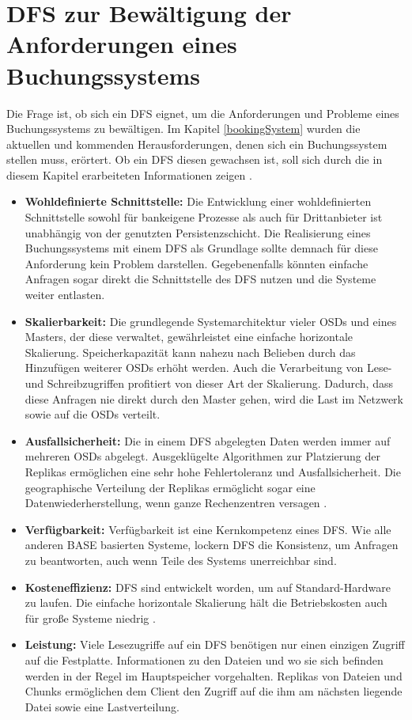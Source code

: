 \documentclass[12pt,oneside,a4paper,parskip]{scrbook}
\begin{document}
\section{DFS zur Bewältigung der Anforderungen eines Buchungssystems}
Die Frage ist, ob sich ein DFS eignet, um die Anforderungen und Probleme eines Buchungssystems zu bewältigen.
Im Kapitel \ref{bookingSystem} wurden die aktuellen und kommenden Herausforderungen, denen sich ein Buchungssystem stellen muss, erörtert. Ob ein DFS diesen gewachsen ist, soll sich durch die in diesem Kapitel erarbeiteten Informationen zeigen \cite{largeHadoop}.


\begin{itemize}
  \item \textbf{Wohldefinierte Schnittstelle:} Die Entwicklung einer wohldefinierten Schnittstelle sowohl für bankeigene Prozesse als auch für Drittanbieter ist unabhängig von der genutzten Persistenzschicht. Die Realisierung eines Buchungssystems mit einem DFS als Grundlage sollte demnach für diese Anforderung kein Problem darstellen. Gegebenenfalls könnten einfache Anfragen sogar direkt die Schnittstelle des DFS nutzen und die Systeme weiter entlasten.

  \item \textbf{Skalierbarkeit:} Die grundlegende Systemarchitektur vieler OSDs und eines Masters, der diese verwaltet, gewährleistet eine einfache horizontale Skalierung. Speicherkapazität kann nahezu nach Belieben durch das Hinzufügen weiterer OSDs erhöht werden. Auch die Verarbeitung von Lese- und Schreibzugriffen profitiert von dieser Art der Skalierung. Dadurch, dass diese Anfragen nie direkt durch den Master gehen, wird die Last im Netzwerk sowie auf die OSDs verteilt.

  \item \textbf{Ausfallsicherheit:} Die in einem DFS abgelegten Daten werden immer auf mehreren OSDs abgelegt. Ausgeklügelte Algorithmen zur Platzierung der Replikas ermöglichen eine sehr hohe Fehlertoleranz und Ausfallsicherheit. Die geographische Verteilung der Replikas ermöglicht sogar eine Datenwiederherstellung, wenn ganze Rechenzentren versagen \cite{osvideo}.

  \item \textbf{Verfügbarkeit:} Verfügbarkeit ist eine Kernkompetenz eines DFS. Wie alle anderen BASE basierten Systeme, lockern DFS die Konsistenz, um Anfragen zu beantworten, auch wenn Teile des Systems unerreichbar sind.

  \item \textbf{Kosteneffizienz:} DFS sind entwickelt worden, um auf Standard-Hardware zu laufen. Die einfache horizontale Skalierung hält die Betriebskosten auch für große Systeme niedrig \cite{rdbmssuck}.

  \item \textbf{Leistung:} Viele Lesezugriffe auf ein DFS benötigen nur einen einzigen Zugriff auf die Festplatte. Informationen zu den Dateien und wo sie sich befinden werden in der Regel im Hauptspeicher vorgehalten. Replikas von Dateien und Chunks ermöglichen dem Client den Zugriff auf die ihm am nächsten liegende Datei sowie eine Lastverteilung. 
\end{itemize}
\end{document}
